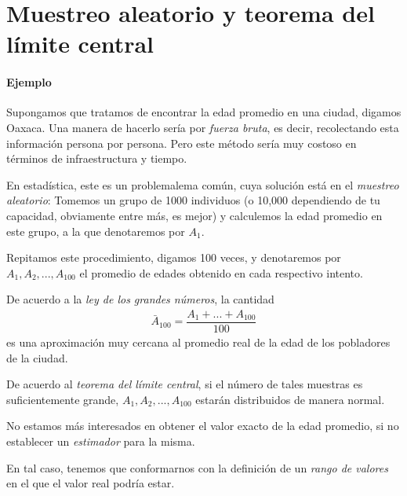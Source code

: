 \section{Muestreo aleatorio y teorema del límite central}

\paragraph{Ejemplo}
Supongamos que tratamos de encontrar la edad promedio en una ciudad, digamos Oaxaca. Una manera de hacerlo sería por \emph{fuerza bruta}, es decir, recolectando esta información persona por persona. Pero este método sería muy costoso en términos de infraestructura y tiempo.


En estadística, este es un problemalema común, cuya solución está en el \emph{muestreo aleatorio}:  Tomemos un grupo de 1000 individuos (o 10,000 dependiendo de tu capacidad, obviamente entre más, es mejor) y calculemos la edad promedio en este grupo, a la que denotaremos por $A_{1}.$ 


Repitamos este procedimiento, digamos 100 veces, y denotaremos por $A_{1}, A_{2},...,A_{100}$ el promedio de edades obtenido en cada respectivo intento.

De acuerdo a la \emph{ley de los grandes números}, la cantidad
\begin{align}
	\bar{A}_{100}=\dfrac{A_{1}+...+A_{100}}{100}
\end{align}
es una aproximación muy cercana al promedio real de la edad de los pobladores de la ciudad.


De acuerdo al \emph{teorema del límite central}, si el número de tales muestras es suficientemente grande,
$A_{1},A_{2},...,A_{100}$ estarán distribuidos de manera normal.


\begin{observacion}
	No estamos más interesados en obtener el valor exacto de la edad promedio, si no establecer un \emph{estimador} para la misma. 
	
	En tal caso,
	tenemos que conformarnos con la definición de un \emph{rango de valores} en el que el valor real podría estar.
\end{observacion}


% 
% 
